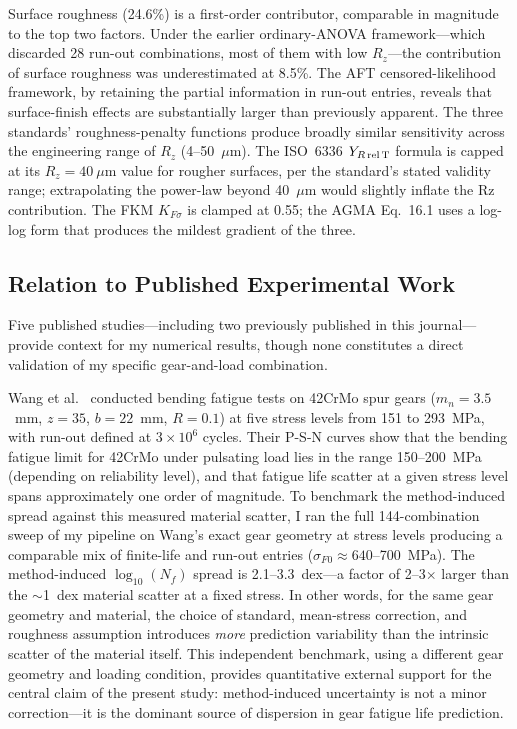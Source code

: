 \documentclass[12pt,a4paper]{article}
\begin{document}
Surface roughness (24.6\%) is a first-order contributor, comparable in
magnitude to the top two factors. Under the earlier ordinary-ANOVA
framework---which discarded 28 run-out combinations, most of them with
low $R_z$---the contribution of surface roughness was underestimated at
8.5\%. The AFT censored-likelihood framework, by retaining the partial
information in run-out entries, reveals that surface-finish effects are
substantially larger than previously apparent. The three standards'
roughness-penalty functions produce broadly similar sensitivity across
the engineering range of $R_z$ (4--50~$\mu$m). The ISO~6336
$Y_{R\,\rm rel\,T}$ formula is capped at its $R_z=40~\mu$m value for
rougher surfaces, per the standard's stated validity range; extrapolating
the power-law beyond 40~$\mu$m would slightly inflate the Rz contribution.
The FKM $K_{F\sigma}$ is clamped at 0.55; the AGMA Eq.~16.1 uses a
log-log form that produces the mildest gradient of the three.

\subsection{Relation to Published Experimental Work}

Five published studies---including two previously published in
this journal---provide context for my numerical results, though
none constitutes a direct validation of my specific
gear-and-load combination.

Wang et al.~\cite{wang2023} conducted bending fatigue tests on 42CrMo
spur gears ($m_n{=}3.5$~mm, $z{=}35$, $b{=}22$~mm, $R{=}0.1$) at five
stress levels from 151 to 293~MPa, with run-out defined at $3\times10^6$
cycles. Their P-S-N curves show that the bending fatigue limit for
42CrMo under pulsating load lies in the range 150--200~MPa (depending on
reliability level), and that fatigue life scatter at a given stress level
spans approximately one order of magnitude. To benchmark the
method-induced spread against this measured material scatter, I ran the
full 144-combination sweep of my pipeline on Wang's exact gear geometry
at stress levels producing a comparable mix of finite-life and run-out
entries ($\sigma_{F0} \approx 640$--700~MPa). The method-induced
$\log_{10}(N_f)$ spread is 2.1--3.3~dex---a factor of 2--3$\times$
larger than the $\sim$1~dex material scatter at a fixed stress. In other
words, for the same gear geometry and material, the choice of standard,
mean-stress correction, and roughness assumption introduces \emph{more}
prediction variability than the intrinsic scatter of the material itself.
This independent benchmark, using a different gear geometry and loading
condition, provides quantitative external support for the central claim
of the present study: method-induced uncertainty is not a minor
correction---it is the dominant source of dispersion in gear fatigue
life prediction.
\end{document}
